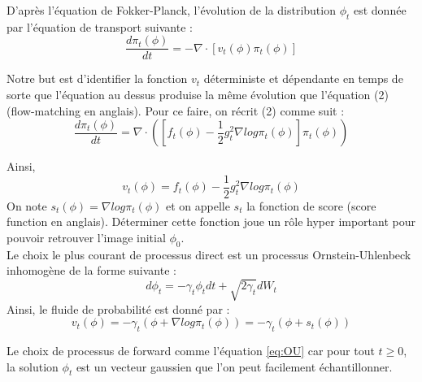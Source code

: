 \documentclass[a4paper,10pt]{article}
\theoremstyle{definition} %
\theoremstyle{definition} %
\theoremstyle{definition} %
\theoremstyle{definition} %
\begin{document}
D'après l'équation de Fokker-Planck, l'évolution de la distribution $\phi_t$ est donnée par l'équation de transport suivante :
\[\frac{d\pi_t(\phi)}{dt} =-\nabla \cdot [v_t(\phi)\pi_t(\phi)]\]

Notre but est d'identifier la fonction $v_t$ déterministe et dépendante en temps de sorte que l'équation au dessus produise la même évolution que l'équation (2) (flow-matching en anglais). Pour ce faire, on récrit (2) comme suit :
\[\frac{d\pi_t(\phi)}{dt} =\nabla \cdot([f_t(\phi)-\frac{1}{2}g_t^2\nabla log\pi_t(\phi)]\pi_t(\phi))\]

Ainsi,
\[v_t(\phi) =f_t(\phi)-\frac{1}{2}g_t^2\nabla log\pi_t(\phi) \]
On note $s_t(\phi) = \nabla log\pi_t(\phi)$ et on appelle $s_t$ la fonction de score (score function en anglais). Déterminer cette fonction joue un rôle hyper important pour pouvoir retrouver l'image initial $\phi_0$.\\

Le choix le plus courant de processus direct est un processus Ornstein-Uhlenbeck inhomogène de la forme suivante :
\begin{equation}\label{eq:OU}
    d\phi_t = -\gamma_t\phi_tdt + \sqrt{2\gamma_t}dW_t
\end{equation}
Ainsi, le fluide de probabilité est donné par :
\begin{equation}\label{eq:backward}
    v_t(\phi) = -\gamma_t(\phi+\nabla log \pi_t(\phi)) = -\gamma_t(\phi+s_t(\phi))
\end{equation}

Le choix de processus de forward comme l'équation \eqref{eq:OU} car pour tout $t \geq 0$, la solution $\phi_t$ est un vecteur gaussien que l'on peut facilement échantillonner. 
\end{document}
